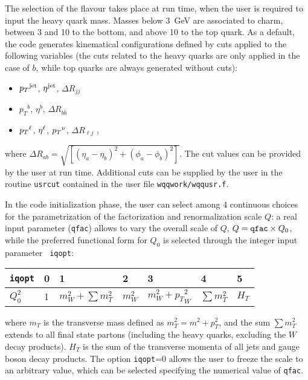 \documentclass[paper]{JHEP3}
\def    \bbar   {\bar{b}}
\def    \pt             {\mbox{$p_T$}}
\def    \ptsq           {\mbox{$p^2_T$}}
\def    \mT             {\mbox{$m_T$}}
\def    \mTsq           {\mbox{$m^2_T$}}
\begin{document}
The selection of the flavour takes place at run time, when the user is
required to input the heavy quark mass. Masses below 3~GeV are
associated to charm, between 3 and 10 to the bottom, and above 10 to
the top quark. 
As a default, the code generates kinematical configurations defined by
cuts applied to the following variables (the cuts related to the heavy
quarks are only applied in the case of $b$, while top quarks are
always generated without cuts):
\begin{itemize}
\item $\pt^{\rm jet}$, $\eta^{\rm jet}$, $\Delta R_{jj}$
\item $\pt^{ b}$, $\eta^{ b}$, $\Delta R_{b\bbar}$ 
\item $\pt^{\rm \ell}$, $\eta^{\rm \ell}$, $\pt^{\rm \nu}$, $\Delta
  R_{\ell j}$ ,
\end{itemize}
where $\Delta R_{ab}=\sqrt{ [(\eta_a - \eta_b)^2+(\phi_a-\phi_b)^2 ]}$.
The  cut values can be provided by the user at run
time. Additional cuts can be supplied by the user in the 
routine {\tt usrcut} contained in the user file {\tt wqqwork/wqqusr.f}.

In the code initialization phase, 
the user can select among 4 continuous choices for the parametrization
of the factorization and renormalization scale $Q$: a real input
parameter ({\tt qfac}) allows to vary the overall scale of $Q$,
$Q={\tt qfac}\times Q_0$, while the preferred functional form for
$Q_0$ is selected through the integer input parameter {\tt
  iqopt}:
{\renewcommand{\arraystretch}{1.2}
\begin{center}
\begin{tabular}{l||l|l|l|l|l|l|}
{\tt iqopt} & 0 & 1 & 2 & 3 & 4 & 5\\  \hline
$Q_0^2$ & 1 & $m_W^2+ \sum \mTsq$ & $m_W^2$ & $m_W^2+\pt_W^2$ & $\sum
\mTsq$ & $H_T$ 
\end{tabular}
\end{center}
}
where $\mT$ is the transverse mass defined as $\mTsq=m^2+\ptsq$,
and the sum $\sum \mTsq $ extends to all final
state partons (including the heavy quarks, excluding the $W$ decay products).
$H_T$ is the sum of the transverse momenta of all jets and gauge boson
decay products.
The option  {\tt iqopt}=0 allows the user to freeze the scale to an
arbitrary value, which can be selected specifying the numerical value
of {\tt qfac}.   
 
\end{document}

